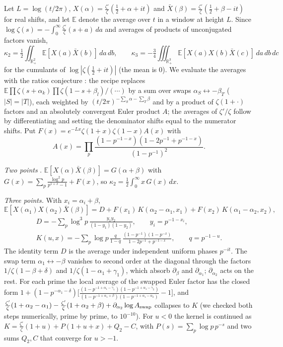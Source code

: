 \documentclass[12pt]{amsart}
\theoremstyle{remark}
\newcommand{\E}{\mathbb{E}}
\newcommand{\1}{\mathbf{1}}
\begin{document}
Let $L=\log(t/2\pi)$, $X(\alpha)=\frac{\zeta'}\zeta(\frac12+\alpha+it)$ and
$\bar X(\beta)=\frac{\zeta'}\zeta(\frac12+\beta-it)$ for real shifts, and let
$\E$ denote the average over $t$ in a window at height $L$. Since
$\log\zeta(s)=-\int_0^\infty\frac{\zeta'}\zeta(s+a)\,da$ and averages of
products of unconjugated factors vanish,
\begin{equation}\label{eq:k23}
\kappa_2=\tfrac12\iint_{\mathbb R_+^2}\E[X(a)\bar X(b)]\,da\,db,\qquad
\kappa_3=-\tfrac34\iiint_{\mathbb R_+^3}\E[X(a)X(b)\bar X(c)]\,da\,db\,dc
\end{equation}
for the cumulants of $\log|\zeta(\frac12+it)|$ (the mean is $0$). We
evaluate the averages with the ratios conjecture \cite{CFZ08}: the recipe
replaces $\E\prod\zeta(s+\alpha_k)\prod\zeta(1-s+\beta_l)/(\cdots)$ by a sum
over swaps $\alpha_S\leftrightarrow-\beta_T$ ($|S|=|T|$), each weighted by
$(t/2\pi)^{-\sum_S\alpha-\sum_T\beta}$ and by a product of $\zeta(1+\cdot)$
factors and an absolutely convergent Euler product $A$; the averages of
$\zeta'/\zeta$ follow by differentiating and setting the denominator shifts
equal to the numerator shifts. Put $F(x)=e^{-Lx}\zeta(1+x)\zeta(1-x)A(x)$
with
\[
A(x)=\prod_p\frac{(1-p^{-1-x})(1-2p^{-1}+p^{-1-x})}{(1-p^{-1})^2}.
\]

\emph{Two points} \cite{CS07}. $\E[X(\alpha)\bar X(\beta)]=G(\alpha+\beta)$
with $G(x)=\sum_p\frac{\log^2p}{p^{1+x}-1}+F(x)$, so
$\kappa_2=\frac12\int_0^\infty x\,G(x)\,dx$.

\emph{Three points.} With $x_i=\alpha_i+\beta$,
\begin{equation}\label{eq:three}
\E[X(\alpha_1)X(\alpha_2)\bar X(\beta)]=D+F(x_1)\,K(\alpha_2-\alpha_1,x_1)
+F(x_2)\,K(\alpha_1-\alpha_2,x_2),
\end{equation}
\begin{gather*}
D=-\sum_p\log^3p\,\frac{y_1y_2}{(1-y_1)(1-y_2)},\qquad y_i=p^{-1-x_i},\\
K(u,x)=-\sum_p\log p\,\frac{q}{1-q}\,
\frac{(1-p^{-1})(1-p^{-x})}{1-2p^{-1}+p^{-1-x}},\qquad q=p^{-1-u}.
\end{gather*}
The identity term $D$ is the average under independent uniform phases
$p^{-it}$. The swap term $\alpha_1\leftrightarrow-\beta$ vanishes to second
order at the diagonal through the factors $1/\zeta(1-\beta+\delta)$ and
$1/\zeta(1-\alpha_1+\gamma_1)$, which absorb $\partial_\beta$ and
$\partial_{\alpha_1}$; $\partial_{\alpha_2}$ acts on the rest. For each
prime the local average of the swapped Euler factor has the closed form
$1+(1-p^{-\alpha_1-\delta})\bigl[\frac{(1-p^{-1+\alpha_1-\gamma_1})
(1-p^{-1+\alpha_1-\gamma_2})}{(1-p^{-1+\alpha_1+\beta})(1-p^{-1+\alpha_1-\alpha_2})}-1\bigr]$,
and $\frac{\zeta'}\zeta(1+\alpha_2-\alpha_1)-\frac{\zeta'}\zeta(1+\alpha_2+\beta)
+\partial_{\alpha_2}\log A_{\rm swap}$ collapses to $K$ (we checked both
steps numerically, prime by prime, to $10^{-10}$). For $u<0$ the kernel is
continued as $K=\frac{\zeta'}\zeta(1+u)+P(1+u+x)+Q_2-C$, with
$P(s)=\sum_p\log p\,p^{-s}$ and two sums $Q_2,C$ that converge for
$u>-1$.
\end{document}
